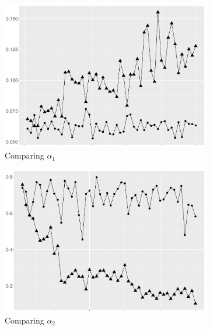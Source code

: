 \begin{figure}[h]
\centering
\begin{subfigure}[t]{0.45\textwidth}
\includegraphics[width=\textwidth]{Chapters/05MCMCOU/plots/realdatacomparea1notupandup2.pdf}
   \caption{Comparing $\alpha_1$}
\end{subfigure}
\begin{subfigure}[t]{0.45\textwidth}
\includegraphics[width=\textwidth]{Chapters/05MCMCOU/plots/realdatacomparea2notupandup2.pdf}
   \caption{Comparing $\alpha_2$}
\end{subfigure}
\begin{subfigure}[t]{0.45\textwidth}

\end{subfigure}
\end{figure}
